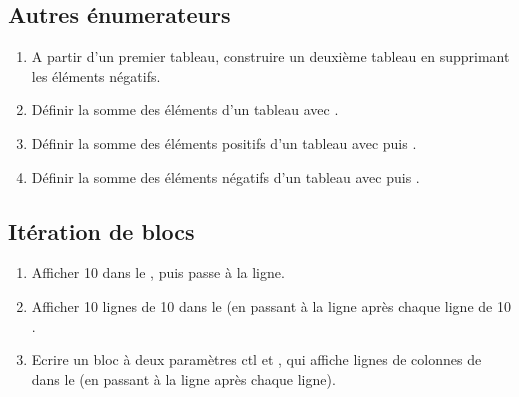 \subsection{Autres \'enumerateurs}
\begin{enumerate}
\item A partir d'un premier tableau, construire un deuxi\`eme tableau en
supprimant les \'el\'ements n\'egatifs.
\item D\'efinir la somme des \'el\'ements d'un tableau
avec .
\item D\'efinir la somme des \'el\'ements positifs d'un tableau
avec  puis .
\item D\'efinir la somme des \'el\'ements n\'egatifs d'un tableau
avec  puis .
\end{enumerate}

\subsection{It\'eration de blocs}

\begin{enumerate}
\item
Afficher 10 \ct{*}  dans le , puis passe \`a la ligne.

\item
Afficher 10 lignes de 10 \ct{*}  dans le  (en passant \`a
la ligne apr\`es chaque ligne de 10 \ct{*}.

\item
Ecrire un bloc \`a deux param\`etres ct{l} et , qui affiche
 lignes de  colonnes de \ct{*}
dans le  (en passant \`a la ligne apr\`es chaque
ligne).
\end{enumerate}
\ifx\wholebook\relax\else\fi
